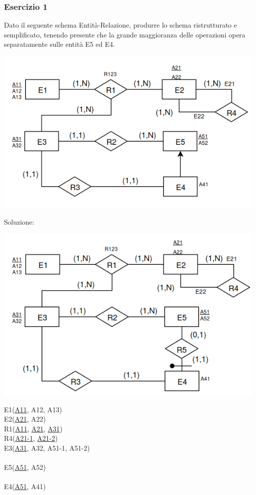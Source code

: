 \documentclass[a4paper]{article}
\begin{document}
\subsubsection{Esercizio 1}
Dato il seguente schema Entità-Relazione, produrre lo schema ristrutturato e semplificato, tenendo presente che la grande maggioranza delle operazioni opera separatamente sulle entità E5 ed E4.
\begin{center}
      \includegraphics[scale=0.5]{img/pl13.png}
\end{center}
Soluzione:
\begin{center}
      \includegraphics[scale=0.5]{img/pl14.png}
\end{center}
E1(\underline{A11}, A12, A13)\\
E2(\underline{A21}, A22)\\
R1(\underline{A11}, \underline{A21}, \underline{A31})\\
R4(\underline{A21-1}, \underline{A21-2})\\
E3(\underline{A31}, A32, A51-1, A51-2)\\
\\
E5(\underline{A51}, A52)\\
\\
E4(\underline{A51}, A41)\\
\end{document}
